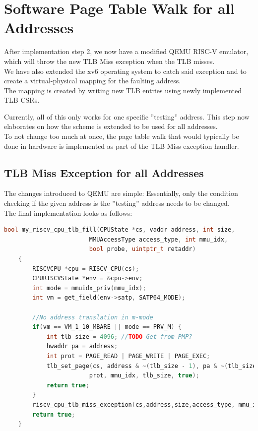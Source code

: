 

\section{Software Page Table Walk for all Addresses}
After implementation step 2, we now have a modified QEMU RISC-V emulator, which will throw the new
TLB Miss exception when the TLB misses.\\
We have also extended the xv6 operating system to catch said exception and to create a virtual-physical
mapping for the faulting address.\\
The mapping is created by writing new TLB entries using newly implemented TLB CSRs.

Currently, all of this only works for one specific ''testing'' address. This step now elaborates on
how the scheme is extended to be used for all addresses.\\
To not change too much at once, the page table walk that would typically be done in hardware is
implemented as part of the TLB Miss exception handler.

\subsection{TLB Miss Exception for all Addresses}
The changes introduced to QEMU are simple: Essentially, only the condition checking if the given address is
the ''testing'' address needs to be changed.\\
The final implementation looks as follows:

\begin{lstlisting}[language=c,float=h!,
    caption={},
    label={lst:updatedTLBFill}]
    bool my_riscv_cpu_tlb_fill(CPUState *cs, vaddr address, int size,
                        MMUAccessType access_type, int mmu_idx,
                        bool probe, uintptr_t retaddr)
    {
        RISCVCPU *cpu = RISCV_CPU(cs);
        CPURISCVState *env = &cpu->env;
        int mode = mmuidx_priv(mmu_idx);
        int vm = get_field(env->satp, SATP64_MODE);

        //No address translation in m-mode
        if(vm == VM_1_10_MBARE || mode == PRV_M) {
            int tlb_size = 4096; //TODO Get from PMP?
            hwaddr pa = address;
            int prot = PAGE_READ | PAGE_WRITE | PAGE_EXEC;
            tlb_set_page(cs, address & ~(tlb_size - 1), pa & ~(tlb_size - 1),
                        prot, mmu_idx, tlb_size, true);
            return true;
        }
        riscv_cpu_tlb_miss_exception(cs,address,size,access_type, mmu_idx, probe, retaddr);
        return true;
    }
\end{lstlisting}

